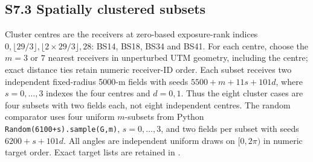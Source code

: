 \documentclass[journal,onecolumn,10pt]{IEEEtran}
\begin{document}
\subsection*{S7.3 Spatially clustered subsets}\label{s7.3-spatially-clustered-subsets}
Cluster centres are the receivers at zero-based exposure-rank indices $0,\lfloor29/3\rfloor,\lfloor2\times29/3\rfloor,28$: BS14, BS18, BS34 and BS41. For each centre, choose the $m=3$ or $7$ nearest receivers in unperturbed UTM geometry, including the centre; exact distance ties retain numeric receiver-ID order. Each subset receives two independent fixed-radius 5000-m fields with seeds $5500+m+11s+101d$, where $s=0,\ldots,3$ indexes the four centres and $d=0,1$. Thus the eight cluster cases are four subsets with two fields each, not eight independent centres. The random comparator uses four uniform $m$-subsets from Python \texttt{Random(6100+s).sample(G,m)}, $s=0,\ldots,3$, and two fields per subset with seeds $6200+s+101d$. All angles are independent uniform draws on $[0,2\pi)$ in numeric target order. Exact target lists are retained in .
\end{document}
